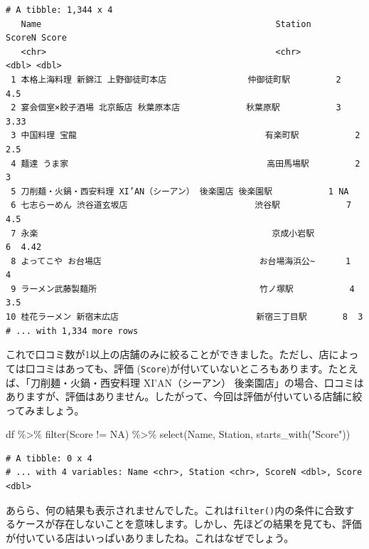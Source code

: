 \documentclass[
  a4paper,
  pandoc,
  ja=standard,
  jafont=haranoaji]{bxjsbook}
\newenvironment{Shaded}{\begin{snugshade}}{\end{snugshade}}
\newcommand{\ConstantTok}[1]{\textcolor[rgb]{0.56,0.35,0.01}{#1}}
\newcommand{\FunctionTok}[1]{\textcolor[rgb]{0.28,0.35,0.67}{#1}}
\newcommand{\NormalTok}[1]{\textcolor[rgb]{0.00,0.48,0.65}{#1}}
\newcommand{\SpecialCharTok}[1]{\textcolor[rgb]{0.37,0.37,0.37}{#1}}
\newcommand{\StringTok}[1]{\textcolor[rgb]{0.13,0.47,0.30}{#1}}
\begin{document}
\begin{verbatim}
# A tibble: 1,344 x 4
   Name                                              Station       ScoreN Score
   <chr>                                             <chr>          <dbl> <dbl>
 1 本格上海料理 新錦江 上野御徒町本店                仲御徒町駅         2  4.5 
 2 宴会個室×餃子酒場 北京飯店 秋葉原本店             秋葉原駅           3  3.33
 3 中国料理 宝龍                                     有楽町駅           2  2.5 
 4 麺達 うま家                                       高田馬場駅         2  3   
 5 刀削麺・火鍋・西安料理 XI’AN（シーアン） 後楽園店 後楽園駅           1 NA   
 6 七志らーめん 渋谷道玄坂店                         渋谷駅             7  4.5 
 7 永楽                                              京成小岩駅         6  4.42
 8 よってこや お台場店                               お台場海浜公~      1  4   
 9 ラーメン武藤製麺所                                竹ノ塚駅           4  3.5 
10 桂花ラーメン 新宿末広店                           新宿三丁目駅       8  3   
# ... with 1,334 more rows
\end{verbatim}

これで口コミ数が1以上の店舗のみに絞ることができました。ただし、店によっては口コミはあっても、評価
(\texttt{Score})が付いていないところもあります。たとえば、「刀削麺・火鍋・西安料理
XI'AN（シーアン）
後楽園店」の場合、口コミはありますが、評価はありません。したがって、今回は評価が付いている店舗に絞ってみましょう。

\begin{Shaded}
\begin{Highlighting}[numbers=left,,]
\NormalTok{df }\SpecialCharTok{\%\textgreater{}\%}
  \FunctionTok{filter}\NormalTok{(Score }\SpecialCharTok{!=} \ConstantTok{NA}\NormalTok{) }\SpecialCharTok{\%\textgreater{}\%}
  \FunctionTok{select}\NormalTok{(Name, Station, }\FunctionTok{starts\_with}\NormalTok{(}\StringTok{"Score"}\NormalTok{))}
\end{Highlighting}
\end{Shaded}

\begin{verbatim}
# A tibble: 0 x 4
# ... with 4 variables: Name <chr>, Station <chr>, ScoreN <dbl>, Score <dbl>
\end{verbatim}

あらら、何の結果も表示されませんでした。これは\texttt{filter()}内の条件に合致するケースが存在しないことを意味します。しかし、先ほどの結果を見ても、評価が付いている店はいっぱいありましたね。これはなぜでしょう。
\end{document}
